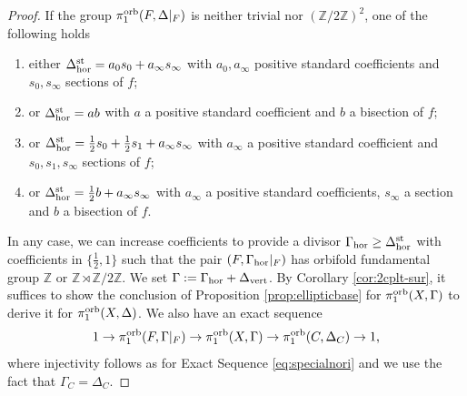 \documentclass{amsart}
\newcommand{\zz}{\mathbb{Z}}
\theoremstyle{definition}
\theoremstyle{remark}
\numberwithin{equation}{section}
\begin{document}
\begin{proof}
\medskip

If the group $\pi_1^{\rm orb}(F,\Delta|_F)$ is neither trivial nor $(\zz/2\zz)^2$, one of the following holds
\begin{enumerate}[label=\alph*)]
    \item either $\Delta_{\rm hor}^{\rm st}= a_0 s_0 + a_{\infty} s_{\infty}$ with $a_0,a_{\infty}$ positive standard coefficients and $s_0,s_{\infty}$ sections of $f$;
    \item or $\Delta_{\rm hor}^{\rm st}= a b$ with $a$ a positive standard coefficient and $b$ a bisection of $f$;
    \item or $\Delta_{\rm hor}^{\rm st} = \frac{1}{2}s_0+\frac{1}{2}s_1+a_{\infty} s_{\infty}$ with $a_{\infty}$ a positive standard coefficient and $s_0,s_1,s_{\infty}$ sections of $f$;
    \item or $\Delta_{\rm hor}^{\rm st} = \frac{1}{2}b+a_{\infty} s_{\infty}$ with $a_{\infty}$ a positive standard coefficients, $s_{\infty}$ a section and $b$ a bisection of $f$.
\end{enumerate}
In any case, we can increase coefficients to provide a divisor $\Gamma_{\rm hor}\ge \Delta_{\rm hor}^{\rm st}$ with coefficients in $\{\frac{1}{2},1\}$ such that the pair $(F,\Gamma_{\rm hor}|_F)$ has orbifold fundamental group $\zz$ or $\zz\rtimes \zz/2\zz$. %
We set $\Gamma:=\Gamma_{\rm hor}+\Delta_{\rm vert}$.
By Corollary \ref{cor:2cplt-sur}, it suffices to show the conclusion of Proposition \ref{prop:ellipticbase} for $\pi_1^{\rm orb}(X,\Gamma)$ to derive it for $\pi_1^{\rm orb}(X,\Delta)$.%
We also have an exact sequence
\begin{equation}\label{eq:specialnorigamma}
1\to \pi_1^{\rm orb}(F,\Gamma|_F)\to \pi_1^{\rm orb}(X,\Gamma)\to \pi_1^{\rm orb}(C,\Delta_C)\to 1,
\end{equation}
where injectivity follows as for Exact Sequence \eqref{eq:specialnori} and we use the fact that $\Gamma_C=\Delta_C$. 


\end{proof}
\end{document}
